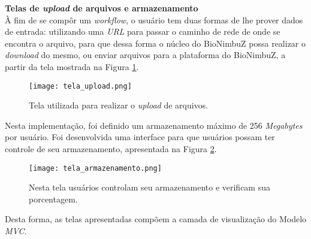 \noindent
\textbf{Telas de \textit{upload} de arquivos e armazenamento} \\

\noindent
À fim de se compôr um \textit{workflow}, o usuário tem duas formas de lhe prover dados de entrada: utilizando uma \textit{URL} para passar o caminho de rede de onde se encontra o arquivo, para que dessa forma o núcleo do BioNimbuZ possa realizar o \textit{download} do mesmo, ou enviar arquivos para a plataforma do BioNimbuZ, a partir da tela mostrada na Figura \ref{fig:tela_upload}. 

\begin{figure}[H]
	\centering
	\texttt{[image: tela\_upload.png]}
	\caption{Tela utilizada para realizar o \textit{upload} de arquivos.}
	\label{fig:tela_upload}
\end{figure}

Nesta implementação, foi definido um armazenamento máximo de 256 \textit{Megabytes} por usuário. Foi desenvolvida uma interface para que usuários possam ter controle de seu armazenamento, apresentada na Figura \ref{fig:tela_armazenamento}.

\begin{figure}[H]
	\centering
	\texttt{[image: tela\_armazenamento.png]}
	\caption{Nesta tela usuários controlam seu armazenamento e verificam sua porcentagem.}
	\label{fig:tela_armazenamento}
\end{figure}

Desta forma, as telas apresentadas compõem a camada de visualização do Modelo \textit{MVC}.
